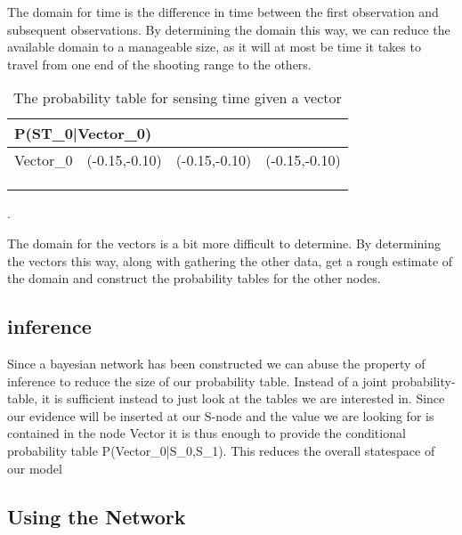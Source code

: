 The domain for time is the difference in time between the first observation and
subsequent observations. By determining the domain this way, we can reduce the
available domain to a manageable size, as it will at most be time it takes to
travel from one end of the shooting range to the others.
\begin{center}
\begin{table}[]
\label{ST_table}
\begin{tabular}{|l|l|l|l|}
\hline
\multicolumn{4}{|l|}{P(ST\_0|Vector\_0)} \\ \hline
Vector\_0     & (-0.15,-0.10) & (-0.15,-0.10)    & (-0.15,-0.10)  \\\hline   
[0 - 1500]      &     &     &     \\ \hline 
[1501 - 3000]    &     &     &     \\ \hline
[3001 - 4500]   &     &     &     \\ \hline
\end{tabular}
\caption{The probability table for sensing time given a vector}
\end{table}
\end{center}

.

The domain for the vectors is a bit more difficult to determine.  By determining the vectors this way,
along with gathering the other data, get a rough estimate of the domain and
construct the probability tables for the other nodes.



\subsection{inference}
Since a bayesian network has been constructed we can abuse the property of
inference to reduce the size of our probability table. Instead of a joint
probability-table, it is sufficient instead to just look at the tables we are
interested in. Since our evidence will be inserted at our S-node and the
value we are looking for is contained in the node Vector it is thus enough to
provide the conditional probability table P(Vector\_0|S\_0,S\_1). This reduces
the overall statespace of our model

\subsection{Using the Network}





